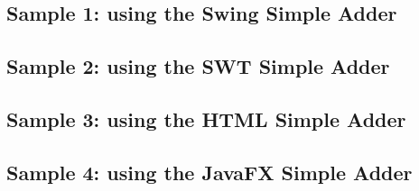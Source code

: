 
\subsection{Sample 1: using the Swing Simple Adder}


\subsection{Sample 2: using the SWT Simple Adder}


\subsection{Sample 3: using the HTML Simple Adder}


\subsection{Sample 4: using the JavaFX  Simple Adder}

